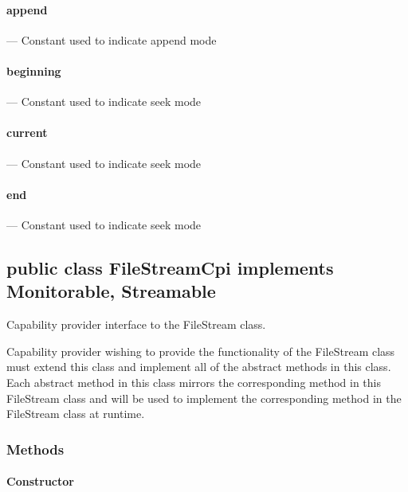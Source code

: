 \documentclass[$Date: 2003/06/26 19:29:31 $]{glabarticle}
\begin{document}
\paragraph{append} --- Constant used to indicate append mode

\paragraph{beginning} --- Constant used to indicate seek mode

\paragraph{current} --- Constant used to indicate seek mode

\paragraph{end} --- Constant used to indicate seek mode


\newpage

\subsection{public class FileStreamCpi implements Monitorable, Streamable}


Capability provider interface to the FileStream class.

Capability provider wishing to provide the functionality of the FileStream class must extend 
this class and implement all of the abstract methods in this class. Each abstract method in this class 
mirrors the corresponding method in this FileStream class and will be used to implement 
the corresponding method in the FileStream class at runtime. 


\subsubsection{Methods}

\paragraph{Constructor}
\end{document}
